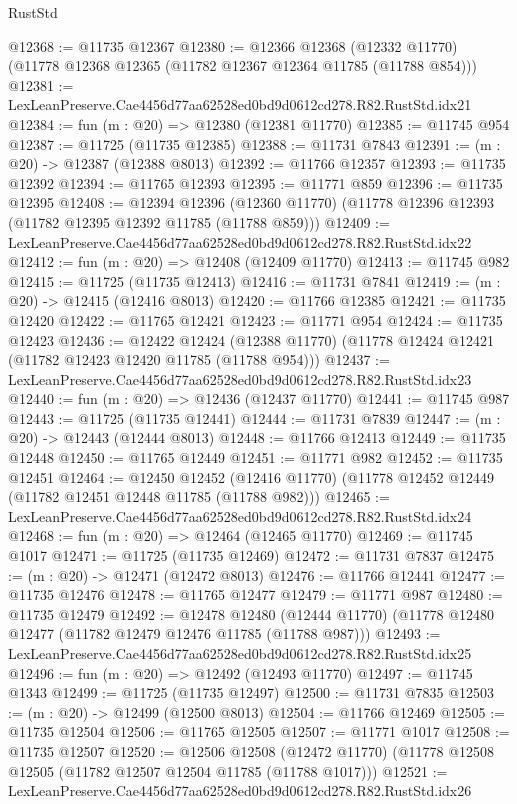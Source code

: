 \begin{lexlean}{RustStd}
\begin{coremodule}
@12368 := @11735 @12367
@12380 := @12366
    @12368
    (@12332 @11770)
    (@11778 @12368 @12365 (@11782 @12367 @12364 @11785 (@11788 @854)))
@12381 := LexLeanPreserve.Cae4456d77aa62528ed0bd9d0612cd278.R82.RustStd.idx21
@12384 := fun (m : @20) => @12380 (@12381 @11770)
@12385 := @11745 @954
@12387 := @11725 (@11735 @12385)
@12388 := @11731 @7843
@12391 := (m : @20) -> @12387 (@12388 @8013)
@12392 := @11766 @12357
@12393 := @11735 @12392
@12394 := @11765 @12393
@12395 := @11771 @859
@12396 := @11735 @12395
@12408 := @12394
    @12396
    (@12360 @11770)
    (@11778 @12396 @12393 (@11782 @12395 @12392 @11785 (@11788 @859)))
@12409 := LexLeanPreserve.Cae4456d77aa62528ed0bd9d0612cd278.R82.RustStd.idx22
@12412 := fun (m : @20) => @12408 (@12409 @11770)
@12413 := @11745 @982
@12415 := @11725 (@11735 @12413)
@12416 := @11731 @7841
@12419 := (m : @20) -> @12415 (@12416 @8013)
@12420 := @11766 @12385
@12421 := @11735 @12420
@12422 := @11765 @12421
@12423 := @11771 @954
@12424 := @11735 @12423
@12436 := @12422
    @12424
    (@12388 @11770)
    (@11778 @12424 @12421 (@11782 @12423 @12420 @11785 (@11788 @954)))
@12437 := LexLeanPreserve.Cae4456d77aa62528ed0bd9d0612cd278.R82.RustStd.idx23
@12440 := fun (m : @20) => @12436 (@12437 @11770)
@12441 := @11745 @987
@12443 := @11725 (@11735 @12441)
@12444 := @11731 @7839
@12447 := (m : @20) -> @12443 (@12444 @8013)
@12448 := @11766 @12413
@12449 := @11735 @12448
@12450 := @11765 @12449
@12451 := @11771 @982
@12452 := @11735 @12451
@12464 := @12450
    @12452
    (@12416 @11770)
    (@11778 @12452 @12449 (@11782 @12451 @12448 @11785 (@11788 @982)))
@12465 := LexLeanPreserve.Cae4456d77aa62528ed0bd9d0612cd278.R82.RustStd.idx24
@12468 := fun (m : @20) => @12464 (@12465 @11770)
@12469 := @11745 @1017
@12471 := @11725 (@11735 @12469)
@12472 := @11731 @7837
@12475 := (m : @20) -> @12471 (@12472 @8013)
@12476 := @11766 @12441
@12477 := @11735 @12476
@12478 := @11765 @12477
@12479 := @11771 @987
@12480 := @11735 @12479
@12492 := @12478
    @12480
    (@12444 @11770)
    (@11778 @12480 @12477 (@11782 @12479 @12476 @11785 (@11788 @987)))
@12493 := LexLeanPreserve.Cae4456d77aa62528ed0bd9d0612cd278.R82.RustStd.idx25
@12496 := fun (m : @20) => @12492 (@12493 @11770)
@12497 := @11745 @1343
@12499 := @11725 (@11735 @12497)
@12500 := @11731 @7835
@12503 := (m : @20) -> @12499 (@12500 @8013)
@12504 := @11766 @12469
@12505 := @11735 @12504
@12506 := @11765 @12505
@12507 := @11771 @1017
@12508 := @11735 @12507
@12520 := @12506
    @12508
    (@12472 @11770)
    (@11778 @12508 @12505 (@11782 @12507 @12504 @11785 (@11788 @1017)))
@12521 := LexLeanPreserve.Cae4456d77aa62528ed0bd9d0612cd278.R82.RustStd.idx26

\end{coremodule}
\end{lexlean}

